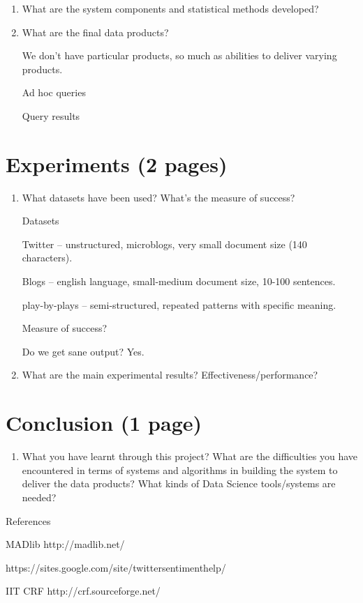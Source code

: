 \documentclass{article}
\begin{document}
\begin{enumerate}
\begin{enumerate}
  \item What are the system components and statistical methods developed?

  \item What are the final data products?

    We don't have particular products, so much as abilities to deliver varying products.

    Ad hoc queries

    Query results
  \end{enumerate}


  \section{Experiments (2 pages)}
  \begin{enumerate}
  \item What datasets have been used? What’s the measure of success?

    Datasets

    Twitter -- unstructured, microblogs, very small document size (140 characters).

    Blogs -- english language, small-medium document size, 10-100 sentences.

    play-by-plays -- semi-structured, repeated patterns with specific meaning.

    Measure of success?

    Do we get sane output? Yes.

  \item What are the main experimental results? Effectiveness/performance?
  \end{enumerate}

  \section{Conclusion (1 page)}
  \begin{enumerate}\item What you have learnt through this project?
    What are the difficulties you have encountered in terms of systems and algorithms in building the system to deliver the data products?
    What kinds of Data Science tools/systems are needed?
  \end{enumerate}
\end{enumerate}

References

MADlib http://madlib.net/

https://sites.google.com/site/twittersentimenthelp/

IIT CRF http://crf.sourceforge.net/
\end{document}
